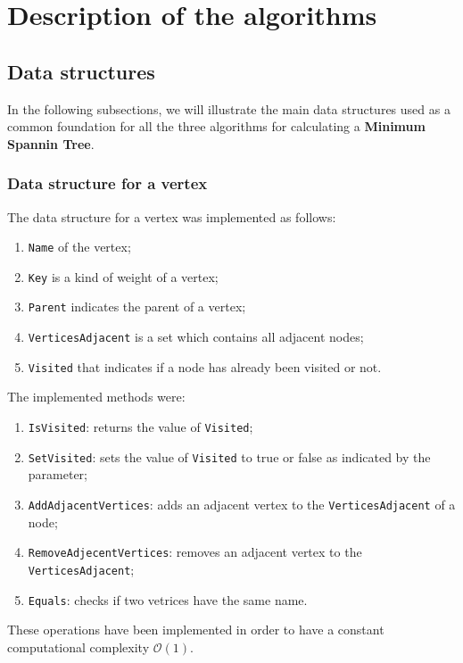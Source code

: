 \section{Description of the algorithms}

\subsection{Data structures}
In the following subsections, we will illustrate the main data structures used as a common foundation for all the 
three algorithms for calculating a \textbf{Minimum Spannin Tree}.

\subsubsection{Data structure for a vertex}
The data structure for a vertex was implemented as follows:
\begin{enumerate}
    \item \verb|Name| of the vertex;
    \item \verb|Key| is a kind of weight of a vertex;
    \item \verb|Parent| indicates the parent of a vertex;
    \item \verb|VerticesAdjacent| is a set which contains all adjacent nodes; 
    \item \verb|Visited| that indicates if a node has already been visited or not.
\end{enumerate}
\noindent
The implemented methods were:
\begin{enumerate}
    \item \verb|IsVisited|: returns the value of \verb|Visited|;
    \item \verb|SetVisited|: sets the value of \verb|Visited| to true or false as indicated by the parameter;
    \item \verb|AddAdjacentVertices|: adds an adjacent vertex to the \verb|VerticesAdjacent| of a node;
    \item \verb|RemoveAdjecentVertices|: removes an adjacent vertex to the \verb|VerticesAdjacent|;
    \item \verb|Equals|: checks if two vetrices have the same name.
\end{enumerate}
These operations have been implemented in order to have a constant computational complexity $\mathcal{O}(1)$.

